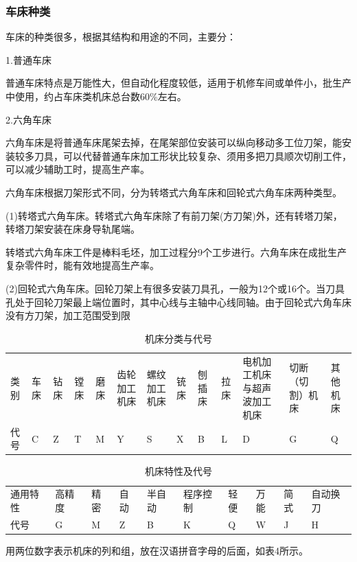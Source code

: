 \documentclass{ctexbook}
\begin{document}
\subsubsection{车床种类}
车床的种类很多，根据其结构和用途的不同，主要分：

1.普通车床

普通车床特点是万能性大，但自动化程度较低，适用于机修车间或单件小，批生产中使用，约占车床类机床总台数60\%左右。

2.六角车床

六角车床是将普通车床尾架去掉，在尾架部位安装可以纵向移动多工位刀架，能安装较多刀具，可以代替普通车床加工形状比较复杂、须用多把刀具顺次切削工件，可以减少辅助工时，提高生产率。

六角车床根据刀架形式不同，分为转塔式六角车床和回轮式六角车床两种类型。

(1)转塔式六角车床。转塔式六角车床除了有前刀架(方刀架)外，还有转塔刀架，转塔刀架安装在床身导轨尾端。

转塔式六角车床工件是棒料毛坯，加工过程分9个工步进行。六角车床在成批生产复杂零件时，能有效地提高生产率。

(2)回轮式六角车床。回轮刀架上有很多安装刀具孔，一般为12个或16个。当刀具孔处于回轮刀架最上端位置时，其中心线与主轴中心线同轴。由于回轮式六角车床没有方刀架，加工范围受到限

\begin{table}[htbp]
	\centering
	\caption{机床分类与代号}
	\begin{tabular}{lllllllllllll}
		类别    & 车床    & 钻床    & 镗床    & 磨床    & 齿轮加工机床 & 螺纹加工机床 & 铳床    & 刨插床   & 拉床    & 电机加工机床与超声波加工机床 & 切断（切割）机床 & 其他机床 \\
		代号    & C     & Z     & T     & M     & Y     & S     & X     & B     & L     & D     & G     & Q \\
	\end{tabular}%
	\label{tab:jichuang}%
\end{table}%


\begin{table}[htbp]
	\centering
	\caption{机床特性及代号}
	\begin{tabular}{llllllllll}
		通用特性  & 高精度   & 精密    & 自动    & 半自动   & 程序控制  & 轻便    & 万能    & 简式    & 自动换刀 \\
		代号    & G     & M     & Z     & B     & K     & Q     & W     & J     & H  \\
	\end{tabular}%
	\label{tab:jichuangtexing}%
\end{table}%
用两位数字表示机床的列和组，放在汉语拼音字母的后面，如表4所示。
\end{document}
